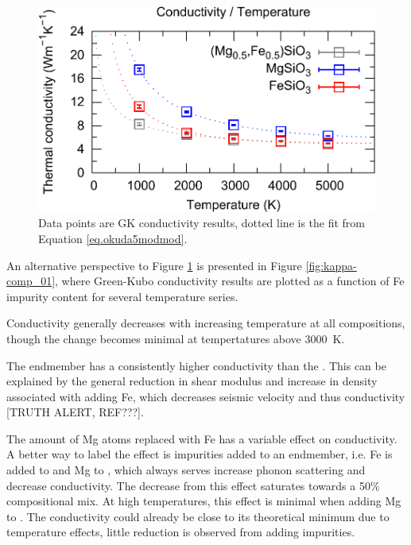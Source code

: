 \begin{figure}[h!]
  \includegraphics[width=\linewidth]{Figures/k-t_all_02.png}
  \caption{Data points are GK conductivity results, dotted line is the fit from Equation \ref{eq.okuda5modmod}.}
  \label{fig:kappa-temp_01}
\end{figure}

An alternative perspective to Figure \ref{fig:kappa-temp_01} is presented in Figure \ref{fig:kappa-comp_01}, where Green-Kubo conductivity results are plotted as a function of Fe impurity content for several temperature series.

Conductivity generally decreases with increasing temperature at all compositions, though the change becomes minimal at tempertatures above 3000~K.

The \mgsios endmember has a consistently higher conductivity than the \fesio. This can be explained by the general reduction in shear modulus and increase in density associated with adding Fe, which decreases seismic velocity and thus conductivity [TRUTH ALERT, REF???].

The amount of Mg atoms replaced with Fe has a variable effect on conductivity. A better way to label the effect is impurities added to an endmember, i.e. Fe is added to \mgsios and Mg to \fesio, which always serves increase phonon scattering and decrease conductivity. The decrease from this effect saturates towards a 50\% compositional mix. At high temperatures, this effect is minimal when adding Mg to \fesio. The conductivity could already be close to its theoretical minimum due to temperature effects, little reduction is observed from adding impurities.

